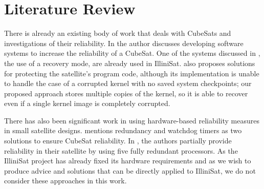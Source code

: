 \section{Literature Review}

There is already an existing body of work that deals with CubeSats and
investigations of their reliability.  In \cite{odegaard2013error} the author
discusses developing software systems to increase the reliability of a CubeSat.
One of the systems discussed in \cite{odegaard2013error}, the use of a
recovery mode, are already used in IlliniSat.  \cite{odegaard2013error} also
proposes solutions for protecting the satellite's program code, although its
implementation is unable to handle the case of a corrupted kernel with no saved
system checkpoints; our proposed approach stores multiple copies of the kernel,
so it is able to recover even if a single kernel image is completely corrupted.

There has also been significant work in using hardware-based reliability measures in small satellite designs.  \cite{toorian2008cubesat} mentions redundancy and watchdog timers as two solutions to ensure CubeSat reliability.  In \cite{passerone2008design}, the authors partially provide reliability in their satellite by using five fully redundant processors.   As the IlliniSat project has already fixed its hardware requirements and as we wish to produce advice and solutions that can be directly applied to IlliniSat, we do not consider these approaches in this work.
